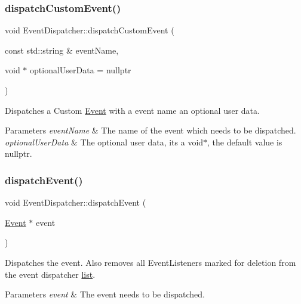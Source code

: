 \subsubsection{\texorpdfstring{dispatch\+Custom\+Event()}{dispatchCustomEvent()}\hspace{0.1cm}{\footnotesize\ttfamily [2/2]}}
{\footnotesize\ttfamily void Event\+Dispatcher\+::dispatch\+Custom\+Event (\begin{DoxyParamCaption}\item[{const std\+::string \&}]{event\+Name,  }\item[{void $\ast$}]{optional\+User\+Data = {\ttfamily nullptr} }\end{DoxyParamCaption})}

Dispatches a Custom \hyperlink{classEvent}{Event} with a event name an optional user data.


\begin{DoxyParams}{Parameters}
{\em event\+Name} & The name of the event which needs to be dispatched. \\
\hline
{\em optional\+User\+Data} & The optional user data, it\textquotesingle{}s a void$\ast$, the default value is nullptr. \\
\hline
\end{DoxyParams}
\mbox{\label{classEventDispatcher_ac6358a032a83c7b1bc3df9beb8f753fe}} 
\subsubsection{\texorpdfstring{dispatch\+Event()}{dispatchEvent()}\hspace{0.1cm}{\footnotesize\ttfamily [1/2]}}
{\footnotesize\ttfamily void Event\+Dispatcher\+::dispatch\+Event (\begin{DoxyParamCaption}\item[{\hyperlink{classEvent}{Event} $\ast$}]{event }\end{DoxyParamCaption})}

Dispatches the event. Also removes all Event\+Listeners marked for deletion from the event dispatcher \hyperlink{protocollist-p}{list}.


\begin{DoxyParams}{Parameters}
{\em event} & The event needs to be dispatched. \\
\hline
\end{DoxyParams}
\mbox{\label{classEventDispatcher_ac6358a032a83c7b1bc3df9beb8f753fe}} 
